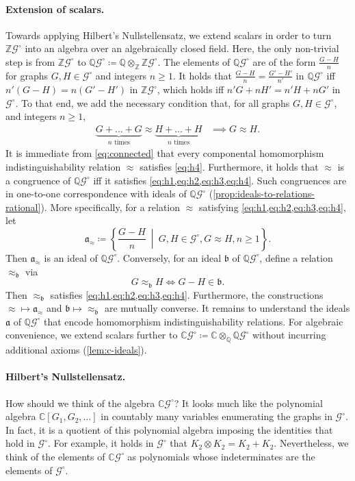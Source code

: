 \documentclass[11pt]{scrartcl}
\theoremstyle{definition}
\theoremstyle{plain}
\theoremstyle{remark}
\newcommand{\lG}{\mathcal{G}^\circ}
\begin{document}
	\paragraph{Extension of scalars.}
	Towards applying Hilbert's Nullstellensatz, we extend scalars in order to turn $\mathbb{Z}\lG$ into an algebra over an algebraically closed field.
	Here, the only non-trivial step is from $\mathbb{Z}\lG$ to $\mathbb{Q}\lG \coloneqq \mathbb{Q} \otimes_{\mathbb{Z}} \mathbb{Z}\lG$.
	The elements of $\mathbb{Q}\lG$ are of the form $\frac{G - H}{n}$ for graphs $G, H \in \lG$ and integers $n \geq 1$.
	It holds that $\frac{G - H}{n} = \frac{G'-H'}{n'}$ in $\mathbb{Q}\lG$ iff $n'(G-H) = n(G'-H')$ in $\mathbb{Z}\lG$, which holds iff $n'G + nH' = n'H + nG'$ in $\lG$.
	To that end, we add the necessary condition that, for all graphs $G, H \in \lG$, and integers $n \geq 1$,
	\begin{align}
		\underbrace{G + \dots + G}_{n \text{ times}}
		\approx
		\underbrace{H + \dots + H}_{n \text{ times}}
		&\implies G \approx H. \label{eq:h4}
	\end{align}
	It is immediate from \cref{eq:connected} that every componental homomorphism indistinguishability relation $\approx$ satisfies \cref{eq:h4}.
	Furthermore, it holds that $\approx$ is a congruence of $\mathbb{Q}\lG$ iff 
	it satisfies \cref{eq:h1,eq:h2,eq:h3,eq:h4}.
	Such congruences are in one-to-one correspondence with ideals of $\mathbb{Q}\lG$ (\cref{prop:ideals-to-relations-rational}).
	More specifically, for a relation $\approx$ satisfying \cref{eq:h1,eq:h2,eq:h3,eq:h4}, let
	\[
		\mathfrak{a}_{\approx} \coloneqq \left\{ \frac{G - H}{n} \ \middle|\ G, H \in \lG, G\approx H, n \geq 1\right\}.
	\]
	Then $\mathfrak{a}_{\approx}$ is an ideal of $\mathbb{Q}\lG$.
	Conversely, for an ideal $\mathfrak{b}$ of $\mathbb{Q}\lG$, define a relation $\approx_{\mathfrak{b}}$ via
	\[
		G \approx_{\mathfrak{b}} H \iff G - H \in \mathfrak{b}.
	\]
	Then $\approx_{\mathfrak{b}}$ satisfies \cref{eq:h1,eq:h2,eq:h3,eq:h4}.
	Furthermore, the constructions ${\approx} \mapsto \mathfrak{a}_{\approx}$
	and $\mathfrak{b} \mapsto {\approx_{\mathfrak{b}}}$ are mutually converse.
	It remains to understand the ideals $\mathfrak{a}$ of $\mathbb{Q}\lG$
	that encode homomorphism indistinguishability relations.
	For algebraic convenience, we extend scalars further to $\mathbb{C}\lG \coloneqq \mathbb{C} \otimes_{\mathbb{Q}} \mathbb{Q}\lG$
	without incurring additional axioms (\cref{lem:c-ideals}).

	

	\paragraph{Hilbert's Nullstellensatz.}
	How should we think of the algebra $\mathbb{C}\lG$?
	It looks much like the polynomial algebra $\mathbb{C}[G_1, G_2, \dots]$ in countably many variables enumerating the graphs in $\lG$.
	In fact, it is a quotient of this polynomial algebra imposing the identities that hold in $\lG$.
	For example, it holds in $\lG$ that $K_2 \otimes K_2 = K_2 + K_2$.
	Nevertheless, we think of the elements of $\mathbb{C}\lG$ as polynomials whose indeterminates are the elements of $\lG$.
	
\end{document}

